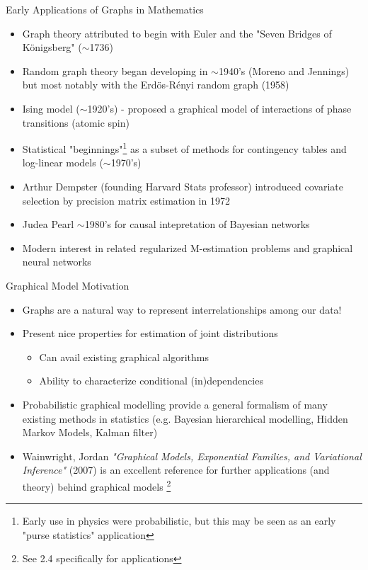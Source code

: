 \documentclass{beamer}
\begin{document}
\begin{frame}{Early Applications of Graphs in Mathematics}
    \begin{itemize}
        \item Graph theory attributed to begin with Euler and the "Seven Bridges of K\"onigsberg" ($\sim$1736)
        \item Random graph theory began developing in $\sim$1940's (Moreno and Jennings) but most notably with the Erd\"os-R\'enyi random graph (1958)
        \item Ising model ($\sim$1920's) - proposed a graphical model of interactions of phase transitions (atomic spin)
        \item Statistical "beginnings"\footnote{Early use in physics were probabilistic, but this may be seen as an early "purse statistics" application} as a subset of methods for contingency tables and log-linear models ($\sim$1970's)
        \item Arthur Dempster (founding Harvard Stats professor) introduced covariate selection by precision matrix estimation in 1972 \cite{dempster_covariance_1972}
        \item Judea Pearl $\sim$1980's for causal intepretation of Bayesian networks
        \item Modern interest in related regularized M-estimation problems and graphical neural networks 
    \end{itemize}
\end{frame}



\begin{frame}{Graphical Model Motivation}
    \begin{itemize}\setlength\itemsep{4mm}
        \item Graphs are a natural way to represent interrelationships among our data! 
        \item Present nice properties for estimation of joint distributions 
        \begin{itemize}
            \item Can avail existing graphical algorithms
            \item Ability to characterize conditional (in)dependencies
        \end{itemize}
        \item Probabilistic graphical modelling provide a general formalism of many existing methods in statistics (e.g. Bayesian hierarchical modelling, Hidden Markov Models, Kalman filter)
        \item Wainwright, Jordan {\it "Graphical Models, Exponential Families, and Variational Inference"} (2007) is an excellent reference for further applications (and theory) behind graphical models \cite{wainwright_graphical_2007}\footnote{See 2.4 specifically for applications}
    \end{itemize}
\end{frame}
\end{document}
